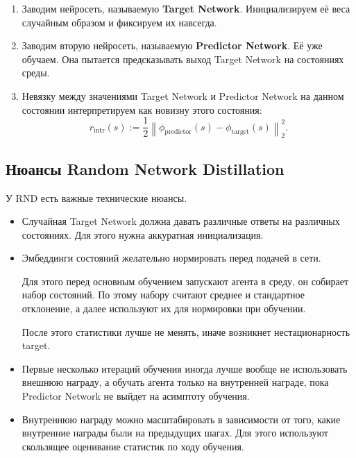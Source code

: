 \documentclass[12pt,a4paper]{article}
\begin{document}
\begin{enumerate}
    \item Заводим нейросеть, называемую \textbf{Target Network}. Инициализируем её веса случайным образом и фиксируем их навсегда.

    \item Заводим вторую нейросеть, называемую \textbf{Predictor Network}. Её уже обучаем. Она пытается предсказывать выход Target Network на состояниях среды.

    \item Невязку между значениями Target Network и Predictor Network на данном состоянии интерпретируем как новизну этого состояния:
    \[
    r_{\mathrm{intr}}(s)
    :=
    \frac{1}{2}
    \left\|
    \phi_{\mathrm{predictor}}(s)
    -
    \phi_{\mathrm{target}}(s)
    \right\|_2^2.
    \]
\end{enumerate}

\subsection{Нюансы Random Network Distillation}

У RND есть важные технические нюансы.

\begin{itemize}
    \item Случайная Target Network должна давать различные ответы на различных состояниях. Для этого нужна аккуратная инициализация.

    \item Эмбеддинги состояний желательно нормировать перед подачей в сети.

    Для этого перед основным обучением запускают агента в среду, он собирает набор состояний. По этому набору считают среднее и стандартное отклонение, а далее используют их для нормировки при обучении.

    После этого статистики лучше не менять, иначе возникнет нестационарность target.

    \item Первые несколько итераций обучения иногда лучше вообще не использовать внешнюю награду, а обучать агента только на внутренней награде, пока Predictor Network не выйдет на асимптоту обучения.

    \item Внутреннюю награду можно масштабировать в зависимости от того, какие внутренние награды были на предыдущих шагах. Для этого используют скользящее оценивание статистик по ходу обучения.
\end{itemize}
\end{document}
